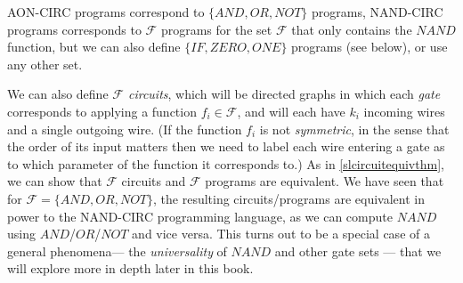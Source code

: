 AON-CIRC programs correspond to
\(\{AND,\ensuremath{\mathit{OR}},\ensuremath{\mathit{NOT}}\}\) programs,
NAND-CIRC programs corresponds to \(\mathcal{F}\) programs for the set
\(\mathcal{F}\) that only contains the \(\ensuremath{\mathit{NAND}}\)
function, but we can also define
\(\{ \ensuremath{\mathit{IF}}, \ensuremath{\mathit{ZERO}}, \ensuremath{\mathit{ONE}}\}\)
programs (see below), or use any other set.

We can also define \emph{\(\mathcal{F}\) circuits}, which will be
directed graphs in which each \emph{gate} corresponds to applying a
function \(f_i \in \mathcal{F}\), and will each have \(k_i\) incoming
wires and a single outgoing wire. (If the function \(f_i\) is not
\emph{symmetric}, in the sense that the order of its input matters then
we need to label each wire entering a gate as to which parameter of the
function it corresponds to.) As in \cref{slcircuitequivthm}, we can show
that \(\mathcal{F}\) circuits and \(\mathcal{F}\) programs are
equivalent. We have seen that for
\(\mathcal{F} = \{ \ensuremath{\mathit{AND}},\ensuremath{\mathit{OR}}, \ensuremath{\mathit{NOT}}\}\),
the resulting circuits/programs are equivalent in power to the NAND-CIRC
programming language, as we can compute \(\ensuremath{\mathit{NAND}}\)
using
\(\ensuremath{\mathit{AND}}\)/\(\ensuremath{\mathit{OR}}\)/\(\ensuremath{\mathit{NOT}}\)
and vice versa. This turns out to be a special case of a general
phenomena--- the \emph{universality} of \(\ensuremath{\mathit{NAND}}\)
and other gate sets --- that we will explore more in depth later in this
book.

\hypertarget{IZOcircuits}{}

